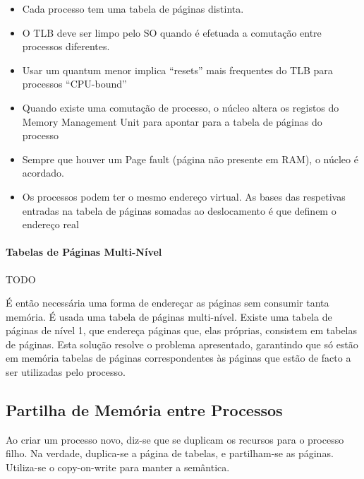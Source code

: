 \documentclass[11pt]{article}
\begin{document}
\begin{itemize}
    \item Cada processo tem uma tabela de páginas distinta.
    \item O TLB deve ser limpo pelo SO quando é efetuada a comutação entre processos diferentes.
    \item Usar um quantum menor implica “resets” mais frequentes do TLB para processos “CPU-bound”
    \item Quando existe uma comutação de processo, o núcleo altera os registos do Memory Management Unit para apontar para a tabela de páginas do processo
    \item Sempre que houver um Page fault (página não presente em RAM), o núcleo é acordado.
    \item Os processos podem ter o mesmo endereço virtual. As bases das respetivas
          entradas na tabela de páginas somadas ao deslocamento é que definem o endereço real
\end{itemize}

\paragraph{Tabelas de Páginas Multi-Nível}

TODO

É então necessária uma forma de endereçar as páginas sem consumir tanta memória. É usada uma tabela de páginas multi-nível. Existe uma tabela de páginas de nível 1, que endereça páginas que, elas próprias, consistem em tabelas de páginas. Esta solução resolve o problema apresentado, garantindo que só estão em memória tabelas de páginas correspondentes às páginas que estão de facto a ser utilizadas pelo processo.

\subsection{Partilha de Memória entre Processos}

Ao criar um processo novo, diz-se que se duplicam os recursos para o processo filho. Na verdade, duplica-se a página de tabelas, e partilham-se as páginas. Utiliza-se o copy-on-write para manter a semântica.
\end{document}
